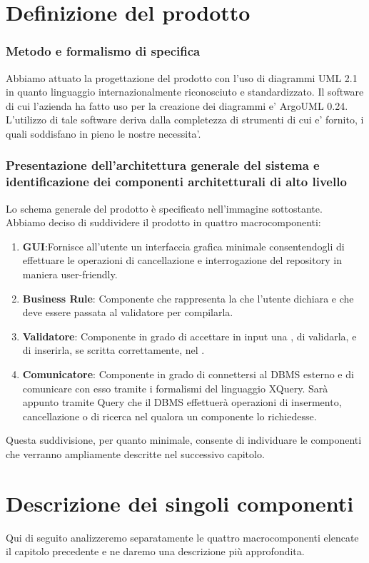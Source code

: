 \documentclass[11pt,titlepage,a4paper]{report}
\begin{document}
\chapter{Definizione del prodotto}
\subsection{Metodo e formalismo di specifica}
Abbiamo attuato la progettazione del prodotto con l'uso di diagrammi UML 2.1 in quanto linguaggio internazionalmente riconosciuto e standardizzato.
Il software di cui l’azienda ha fatto uso per la creazione dei diagrammi e' ArgoUML 0.24. L'utilizzo di tale software deriva dalla completezza
di strumenti di cui e' fornito, i quali soddisfano in pieno le nostre necessita'.

\subsection{Presentazione dell'architettura generale del sistema e identificazione dei componenti architetturali di alto livello}
Lo schema generale del prodotto è specificato nell'immagine sottostante.
Abbiamo deciso di suddividere il prodotto in quattro macrocomponenti:
\begin{enumerate}
 \item \textbf{GUI}:Fornisce all'utente un interfaccia grafica minimale consentendogli di effettuare le operazioni di cancellazione e interrogazione del repository in maniera user-friendly.
\item \textbf{Business Rule}: Componente che rappresenta la \br che l'utente dichiara e che deve essere passata al validatore per compilarla.
\item \textbf{Validatore}: Componente in grado di accettare in input una \br, di validarla, e di inserirla, se scritta correttamente, nel \re.
\item \textbf{Comunicatore}: Componente in grado di connettersi al DBMS esterno e di comunicare con esso tramite i formalismi del linguaggio XQuery.
Sar\`a appunto tramite Query che il DBMS effettuer\`a operazioni di insermento, cancellazione o di ricerca nel \re qualora un componente lo richiedesse.
\end{enumerate}
Questa suddivisione, per quanto minimale, consente di individuare le componenti che verranno ampliamente descritte nel successivo capitolo.

\chapter{Descrizione dei singoli componenti}
Qui di seguito analizzeremo separatamente le quattro macrocomponenti elencate il capitolo precedente e ne daremo una descrizione pi\`u approfondita.
\end{document}
